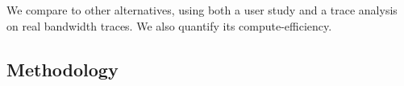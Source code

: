We compare \livo{} to other alternatives, using both a user study and a trace analysis on real bandwidth traces. We also quantify its compute-efficiency.

\subsection{Methodology}
\label{s:methodology}

